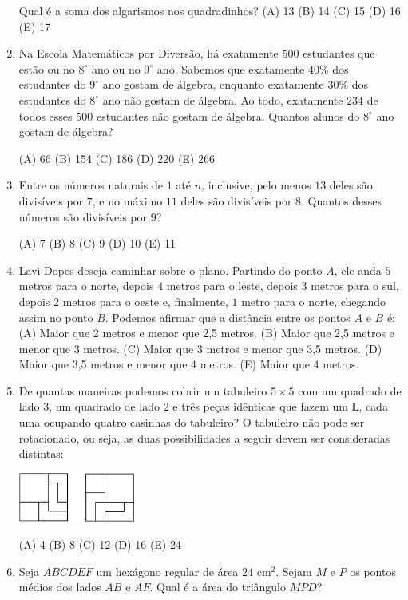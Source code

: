 \documentclass[12pt]{article}
\begin{document}
\begin{enumerate}[label=\textbf{{\arabic*.}}]
Qual é a soma dos algarismos nos quadradinhos?
(A) 13 (B) 14 (C) 15 (D) 16 (E) 17

\item Na Escola Matemáticos por Diversão, há exatamente $500$ estudantes que estão ou no $8^\circ$ ano ou no $9^\circ$ ano. Sabemos que exatamente $40\%$ dos estudantes do $9^\circ$ ano gostam de álgebra, enquanto exatamente $30\%$ dos estudantes do $8^\circ$ ano não gostam de álgebra. Ao todo, exatamente $234$ de todos esses $500$ estudantes não gostam de álgebra. Quantos alunos do $8^\circ$ ano gostam de álgebra?

(A) 66 (B) 154 (C) 186 (D) 220 (E) 266

\item Entre os números naturais de $1$ até $n$, inclusive, pelo menos $13$ deles são divisíveis por $7$, e no máximo $11$ deles são divisíveis por $8$. Quantos desses números são divisíveis por $9$?

(A) 7 (B) 8 (C) 9 (D) 10 (E) 11

\item Lavi Dopes deseja caminhar sobre o plano. Partindo do ponto $A$, ele anda $5$ metros para o norte, depois $4$ metros para o leste, depois $3$ metros para o sul, depois $2$ metros para o oeste e, finalmente, $1$ metro para o norte, chegando assim no ponto $B$. Podemos afirmar que a distância entre os pontos $A$ e $B$ é:
(A) Maior que 2 metros e menor que 2,5 metros.
(B) Maior que 2,5 metros e menor que 3 metros.
(C) Maior que 3 metros e menor que 3,5 metros.
(D) Maior que 3,5 metros e menor que 4 metros.
(E) Maior que 4 metros.

\item De quantas maneiras podemos cobrir um tabuleiro $5\times 5$ com um quadrado de lado $3$, um quadrado de lado $2$ e três peças idênticas que fazem um L, cada uma ocupando quatro casinhas do tabuleiro? O tabuleiro não pode ser rotacionado, ou seja, as duas possibilidades a seguir devem ser consideradas distintas:

    \begin{center}
    \includegraphics[width=0.3\textwidth]{third.png}
  \end{center}


(A) 4 (B) 8 (C) 12 (D) 16 (E) 24

\item Seja $ABCDEF$ um hexágono regular de área $24$ cm$^{2}$. Sejam $M$ e $P$ os pontos médios dos lados $\overline{AB}$ e $\overline{AF}$. Qual é a área do triângulo $MPD$?


\end{enumerate}
\end{document}
